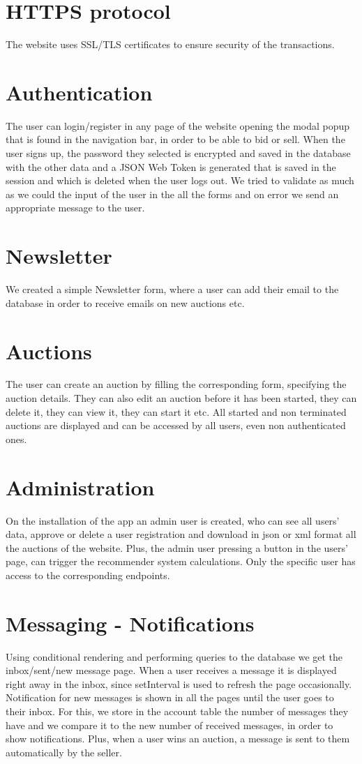 \documentclass{article}
\begin{document}
\section{HTTPS protocol}
The website uses SSL/TLS certificates to ensure security of the transactions.
\section{Authentication}
The user can login/register in any page of the website opening the modal popup that is found in the navigation bar, in order to be able to bid or sell. When the user signs up, the password they selected is encrypted and saved in the database with the other data and a JSON Web Token is generated that is saved in the session and which is deleted when the user logs out. We tried to validate as much as we could the input of the user in the all the forms and on error we send an appropriate message to the user.

\section{Newsletter}
We created a simple Newsletter form, where a user can add their email to the database in order to receive emails on new auctions etc.

\section{Auctions}
The user can create an auction by filling the corresponding form, specifying the auction details. They can also edit an auction before it has been started, they can delete it, they can view it, they can start it etc. All started and non terminated auctions are displayed and can be accessed by all users, even non authenticated ones.

\section{Administration}
On the installation of the app an admin user is created, who can see all users' data, approve or delete a user registration and download in json or xml format all the auctions of the website. Plus, the admin user pressing a button in the users' page, can trigger the recommender system calculations. Only the specific user has access to the corresponding endpoints.

\section{Messaging - Notifications}
Using conditional rendering and performing queries to the  database we get the inbox/sent/new message page. When a user receives a message it is displayed right away in the inbox, since setInterval is used to refresh the page occasionally. Notification for new messages is shown in all the pages until the user goes to their inbox. For this, we store in the account table the number of messages they have and we compare it to the new number of received messages, in order to show notifications. Plus, when a user wins an auction, a message is sent to them automatically by the seller.
\end{document}
